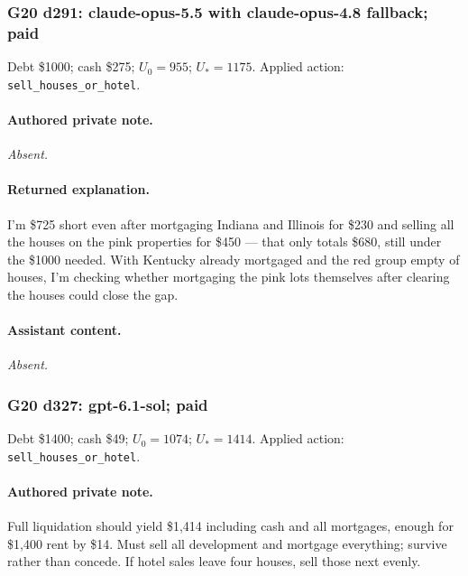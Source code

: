 \medskip

\subsubsection*{G20 d291: claude-opus-5.5 with claude-opus-4.8 fallback; paid}

Debt \$1000; cash \$275; $U_0=955$; $U_*=1175$. Applied action: \texttt{sell\_houses\_or\_hotel}.

\paragraph{Authored private note.}

\textit{Absent.}

\paragraph{Returned explanation.}

{\small I'm \$725 short even after mortgaging Indiana and Illinois for \$230 and selling all the houses on the pink properties for \$450 — that only totals \$680, still under the \$1000 needed. With Kentucky already mortgaged and the red group empty of houses, I'm checking whether mortgaging the pink lots themselves after clearing the houses could close the gap.
\par
\par}

\paragraph{Assistant content.}

\textit{Absent.}

\medskip

\subsubsection*{G20 d327: gpt-6.1-sol; paid}

Debt \$1400; cash \$49; $U_0=1074$; $U_*=1414$. Applied action: \texttt{sell\_houses\_or\_hotel}.

\paragraph{Authored private note.}

{\small Full liquidation should yield \$1,414 including cash and all mortgages, enough for \$1,400 rent by \$14. Must sell all development and mortgage everything; survive rather than concede. If hotel sales leave four houses, sell those next evenly.\par}

